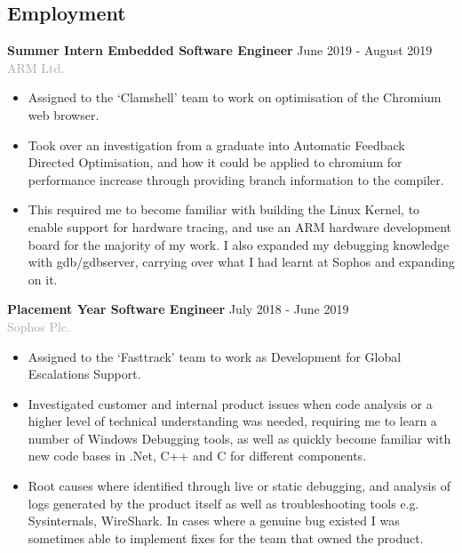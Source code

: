 \documentclass[11pt]{article}
\newcommand{\dash}{\item[-]}
\newcommand{\linesep}{\noindent\makebox[\linewidth]{\rule{\linewidth}{0.2pt}}}
\begin{document}
 \subsection*{Employment}
\textbf{Summer Intern Embedded Software Engineer} \hfill June 2019 - August 2019 \\
\textcolor{darkgray}{ARM Ltd.}
  \begin{itemize}
   \dash Assigned to the ‘Clamshell’ team to work on optimisation of the Chromium web browser.
   \dash Took over an investigation from a graduate into Automatic Feedback Directed Optimisation, and how it could be applied to chromium for performance increase through providing branch information to the compiler.
   \dash This required me to become familiar with building the Linux Kernel, to enable support for hardware tracing, and use an ARM hardware development board for the majority of my work. I also expanded my debugging knowledge with gdb/gdbserver, carrying over what I had learnt at Sophos and expanding on it.
  \end{itemize}
\vspace{10pt}
\textbf{Placement Year Software Engineer} \hfill July 2018 - June 2019 \\
\textcolor{darkgray}{Sophos Plc.}
  \begin{itemize}
   \dash Assigned to the ‘Fasttrack’ team to work as Development for Global Escalations Support.
   \dash Investigated customer and internal product issues when code analysis or a higher level of technical understanding was needed, requiring me to learn a number of Windows Debugging tools, as well as quickly become familiar with new code bases in .Net, C++ and C for different components.
   \dash Root causes where identified through live or static debugging, and analysis of logs generated by the product itself as well as troubleshooting tools e.g. Sysinternals, WireShark. In cases where a genuine bug existed I was sometimes able to implement fixes for the team that owned the product.
  \end{itemize}

  \linesep
\end{document}
